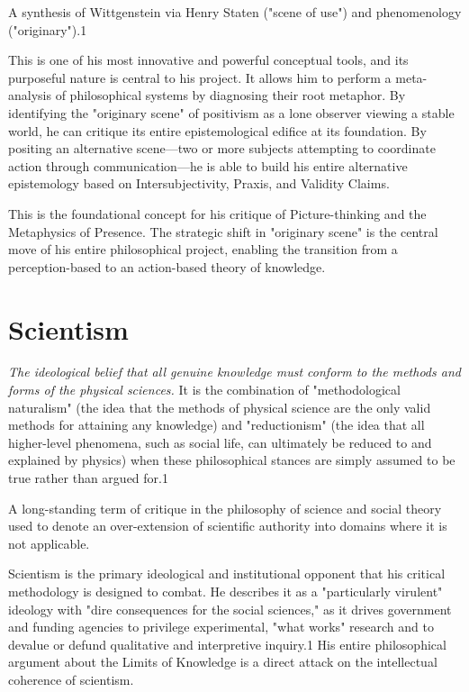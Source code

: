 \documentclass{book}
\begin{document}
A synthesis of Wittgenstein via Henry Staten ("scene of use") and phenomenology ("originary").1

This is one of his most innovative and powerful conceptual tools, and its purposeful nature is central to his project. It allows him to perform a meta-analysis of philosophical systems by diagnosing their root metaphor. By identifying the "originary scene" of positivism as a lone observer viewing a stable world, he can critique its entire epistemological edifice at its foundation. By positing an alternative scene—two or more subjects attempting to coordinate action through communication—he is able to build his entire alternative epistemology based on Intersubjectivity, Praxis, and Validity Claims.

This is the foundational concept for his critique of Picture-thinking and the Metaphysics of Presence. The strategic shift in "originary scene" is the central move of his entire philosophical project, enabling the transition from a perception-based to an action-based theory of knowledge.

\parencite{Carspecken1999}


\section{Scientism}

\textit{The ideological belief that all genuine knowledge must conform to the methods and forms of the physical sciences.} It is the combination of "methodological naturalism" (the idea that the methods of physical science are the only valid methods for attaining any knowledge) and "reductionism" (the idea that all higher-level phenomena, such as social life, can ultimately be reduced to and explained by physics) when these philosophical stances are simply assumed to be true rather than argued for.1

A long-standing term of critique in the philosophy of science and social theory used to denote an over-extension of scientific authority into domains where it is not applicable.

Scientism is the primary ideological and institutional opponent that his critical methodology is designed to combat. He describes it as a "particularly virulent" ideology with "dire consequences for the social sciences," as it drives government and funding agencies to privilege experimental, "what works" research and to devalue or defund qualitative and interpretive inquiry.1 His entire philosophical argument about the Limits of Knowledge is a direct attack on the intellectual coherence of scientism.
\end{document}
